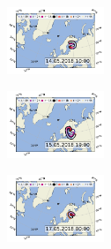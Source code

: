 \begin{figure}[H]
    \centering
    \begin{subfigure}
        \centering
        \includegraphics[width=0.32\textwidth,valign=t]{sosaa-data/figures/trajectories/trajectory-14.05.2018:10.00.pdf}
    \end{subfigure}
    \begin{subfigure}
        \centering
        \includegraphics[width=0.32\textwidth,valign=t]{sosaa-data/figures/trajectories/trajectory-15.05.2018:19.00.pdf}
    \end{subfigure}
    \begin{subfigure}
        \centering
        \includegraphics[width=0.32\textwidth,valign=t]{sosaa-data/figures/trajectories/trajectory-17.05.2018:00.00.pdf}
    \end{subfigure}


\end{figure}
